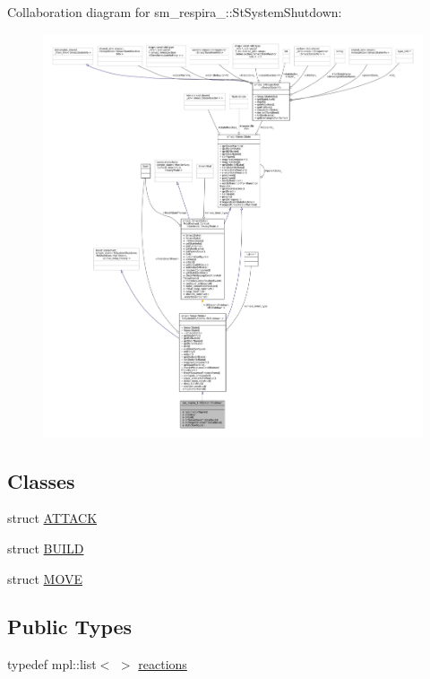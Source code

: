 Collaboration diagram for sm\+\_\+respira\+\_\+:\+:St\+System\+Shutdown\+:
\nopagebreak
\begin{figure}[H]
\begin{center}
\leavevmode
\includegraphics[width=350pt]{structsm__respira__1_1_1StSystemShutdown__coll__graph}
\end{center}
\end{figure}
\subsection*{Classes}
\begin{DoxyCompactItemize}
\item 
struct \hyperlink{structsm__respira__1_1_1StSystemShutdown_1_1ATTACK}{A\+T\+T\+A\+CK}
\item 
struct \hyperlink{structsm__respira__1_1_1StSystemShutdown_1_1BUILD}{B\+U\+I\+LD}
\item 
struct \hyperlink{structsm__respira__1_1_1StSystemShutdown_1_1MOVE}{M\+O\+VE}
\end{DoxyCompactItemize}
\subsection*{Public Types}
\begin{DoxyCompactItemize}
\item 
typedef mpl\+::list$<$ $>$ \hyperlink{structsm__respira__1_1_1StSystemShutdown_ae6fd4a2dbf4f3a8aa45f21074254a24e}{reactions}
\end{DoxyCompactItemize}
